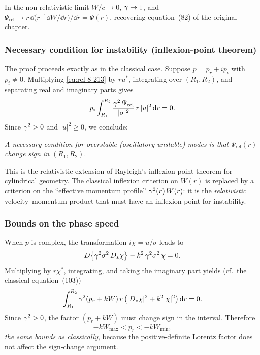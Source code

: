 \begin{relcorrection}
In the non-relativistic limit $W/c\to 0$, $\gamma\to 1$, and
$\Psi_{\mathrm{rel}} \to r\,\dd\bigl(r^{-1}\dd W/\dd r\bigr)/\dd r
= \Psi(r)$, recovering equation~(82) of the original chapter.
\end{relcorrection}

\subsubsection{Necessary condition for instability (inflexion-point
               theorem)}
\label{sec:rel-8-79b-ii}

The proof proceeds exactly as in the classical case.  Suppose
$p=p_{r}+ip_{i}$ with $p_{i}\neq 0$.  Multiplying \eqref{eq:rel-8-213}
by $ru^{*}$, integrating over $(R_{1},R_{2})$, and separating real and
imaginary parts gives
\begin{equation}
\label{eq:rel-8-216}
p_{i}\int_{R_{1}}^{R_{2}}
  \frac{\gamma^{2}\,\Psi_{\mathrm{rel}}}
       {|\sigma|^{2}}\,r\,|u|^{2}\,\mathrm{d} r = 0.
\end{equation}
Since $\gamma^{2}>0$ and $|u|^{2}\ge 0$, we conclude:

\emph{A necessary condition for overstable (oscillatory unstable)
modes is that $\Psi_{\mathrm{rel}}(r)$ change sign in
$(R_{1},R_{2})$}.

\noindent This is the relativistic extension of Rayleigh's
inflexion-point theorem for cylindrical geometry.  The classical
inflexion criterion on $W(r)$ is replaced by a criterion on the
``effective momentum profile'' $\gamma^{2}(r)\,W(r)$: it is the
\emph{relativistic} velocity--momentum product that must have
an inflexion point for instability.

\subsubsection{Bounds on the phase speed}
\label{sec:rel-8-79b-iii}

When $p$ is complex, the transformation $i\chi = u/\sigma$ leads to
\begin{equation}
\label{eq:rel-8-217}
D\bigl\{\gamma^{2}\sigma^{2}\,D_{*}\chi\bigr\}
  - k^{2}\,\gamma^{2}\sigma^{2}\,\chi = 0.
\end{equation}
Multiplying by $r\chi^{*}$, integrating, and taking the imaginary part
yields (cf.\ the classical equation~(103))
\begin{equation}
\label{eq:rel-8-218}
\int_{R_{1}}^{R_{2}}
  \gamma^{2}(p_{r}+kW)\,r\,
  \bigl(|D_{*}\chi|^{2}+k^{2}|\chi|^{2}\bigr)\,\mathrm{d} r = 0.
\end{equation}
Since $\gamma^{2}>0$, the factor $(p_{r}+kW)$ must change sign in the
interval.  Therefore
\begin{equation}
\label{eq:rel-8-219}
-kW_{\max} < p_{r} < -kW_{\min},
\end{equation}
\emph{the same bounds as classically}, because the positive-definite
Lorentz factor does not affect the sign-change argument.

